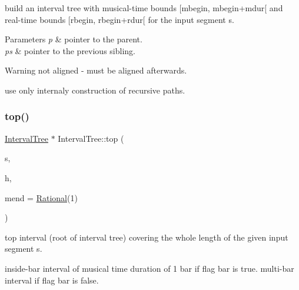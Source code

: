 build an interval tree with musical-\/time bounds \mbox{[}mbegin, mbegin+mdur\mbox{[} and real-\/time bounds \mbox{[}rbegin, rbegin+rdur\mbox{[} for the input segment s. 


\begin{DoxyParams}{Parameters}
{\em p} & pointer to the parent. \\
\hline
{\em ps} & pointer to the previous sibling. \\
\hline
\end{DoxyParams}
\begin{DoxyWarning}{Warning}
not aligned -\/ must be aligned afterwards. 

use only internaly construction of recursive paths. 
\end{DoxyWarning}
\mbox{\label{group__segment_ga0c04840a0d05d3b0d4b99e654d72b81b}} 
\subsubsection{\texorpdfstring{top()}{top()}}
{\footnotesize\ttfamily \mbox{\hyperlink{classIntervalTree}{Interval\+Tree}} $\ast$ Interval\+Tree\+::top (\begin{DoxyParamCaption}\item[{const \mbox{\hyperlink{classInputSegment}{Input\+Segment}} $\ast$}]{s,  }\item[{\mbox{\hyperlink{classIntervalHeap}{Interval\+Heap}} $\ast$}]{h,  }\item[{\mbox{\hyperlink{classRational}{Rational}}}]{mend = {\ttfamily \mbox{\hyperlink{classRational}{Rational}}(1)} }\end{DoxyParamCaption})}



top interval (root of interval tree) covering the whole length of the given input segment s. 

inside-\/bar interval of musical time duration of 1 bar if flag bar is true. multi-\/bar interval if flag bar is false. \mbox{\label{group__segment_gae9e8f6ca3fa4093cfcd1428e9f41d048}} 
